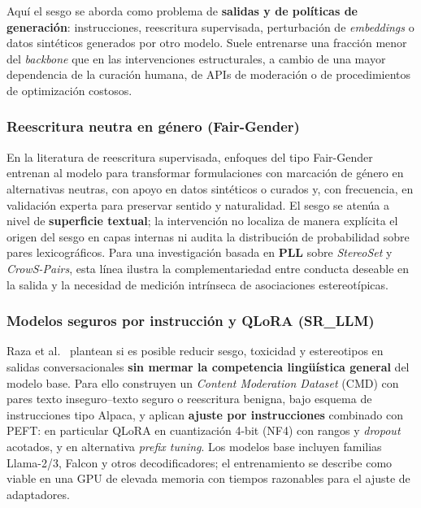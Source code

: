 \documentclass[12pt,a4paper]{report}
\begin{document}
Aquí el sesgo se aborda como problema de \textbf{salidas y de políticas de generación}: instrucciones, reescritura supervisada, perturbación de \textit{embeddings} o datos sintéticos generados por otro modelo. Suele entrenarse una fracción menor del \textit{backbone} que en las intervenciones estructurales, a cambio de una mayor dependencia de la curación humana, de APIs de moderación o de procedimientos de optimización costosos.

\subsubsection{Reescritura neutra en género (Fair-Gender)}

En la literatura de reescritura supervisada, enfoques del tipo Fair-Gender entrenan al modelo para transformar formulaciones con marcación de género en alternativas neutras, con apoyo en datos sintéticos o curados y, con frecuencia, en validación experta para preservar sentido y naturalidad. El sesgo se atenúa a nivel de \textbf{superficie textual}; la intervención no localiza de manera explícita el origen del sesgo en capas internas ni audita la distribución de probabilidad sobre pares lexicográficos. Para una investigación basada en \textbf{PLL} sobre \textit{StereoSet} y \textit{CrowS-Pairs}, esta línea ilustra la complementariedad entre conducta deseable en la salida y la necesidad de medición intrínseca de asociaciones estereotípicas.

\subsubsection{Modelos seguros por instrucción y QLoRA (SR\_LLM)}

Raza et al.\ \cite{raza_developing_2025} plantean si es posible reducir sesgo, toxicidad y estereotipos en salidas conversacionales \textbf{sin mermar la competencia lingüística general} del modelo base. Para ello construyen un \textit{Content Moderation Dataset} (CMD) con pares texto inseguro--texto seguro o reescritura benigna, bajo esquema de instrucciones tipo Alpaca, y aplican \textbf{ajuste por instrucciones} combinado con PEFT: en particular QLoRA en cuantización 4-bit (NF4) con rangos y \textit{dropout} acotados, y en alternativa \textit{prefix tuning}. Los modelos base incluyen familias Llama-2/3, Falcon y otros decodificadores; el entrenamiento se describe como viable en una GPU de elevada memoria con tiempos razonables para el ajuste de adaptadores.
\end{document}
